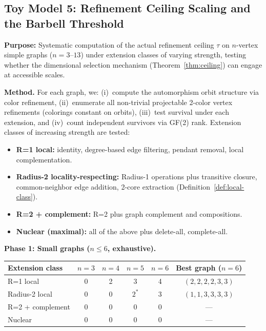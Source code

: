 \documentclass[11pt,a4paper]{article}
\theoremstyle{definition}
\theoremstyle{remark}
\begin{document}
\subsection{Toy Model 5: Refinement Ceiling Scaling and the Barbell Threshold}\label{sec:tm5}

\textbf{Purpose:} Systematic computation of the actual refinement ceiling $\tau$ on $n$-vertex simple graphs ($n = 3$--$13$) under extension classes of varying strength, testing whether the dimensional selection mechanism (Theorem~\ref{thm:ceiling}) can engage at accessible scales.

\textbf{Method.} For each graph, we: (i)~compute the automorphism orbit structure via color refinement, (ii)~enumerate all non-trivial projectable 2-color vertex refinements (colorings constant on orbits), (iii)~test survival under each extension, and (iv)~count independent survivors via GF(2) rank. Extension classes of increasing strength are tested:
\begin{itemize}[nosep]
  \item \textbf{R=1 local:} identity, degree-based edge filtering, pendant removal, local complementation.
  \item \textbf{Radius-2 locality-respecting:} Radius-1 operations plus transitive closure, common-neighbor edge addition, 2-core extraction (Definition~\ref{def:local-class}).
  \item \textbf{R=2 + complement:} R=2 plus graph complement and compositions.
  \item \textbf{Nuclear (maximal):} all of the above plus delete-all, complete-all.
\end{itemize}

\textbf{Phase 1: Small graphs ($n \leq 6$, exhaustive).}

\begin{center}
\begin{tabular}{lccccc}
\toprule
\textbf{Extension class} & \textbf{$n{=}3$} & \textbf{$n{=}4$} & \textbf{$n{=}5$} & \textbf{$n{=}6$} & \textbf{Best graph ($n{=}6$)} \\
\midrule
R=1 local         & 0 & 2 & 3 & 4 & $(2,2,2,2,3,3)$ \\
Radius-2 local      & 0 & 0 & $2^*$ & 3 & $(1,1,3,3,3,3)$ \\
R=2 + complement & 0 & 0 & 0 & 0 & --- \\
Nuclear          & 0 & 0 & 0 & 0 & --- \\
\bottomrule
\end{tabular}
\end{center}
\end{document}
